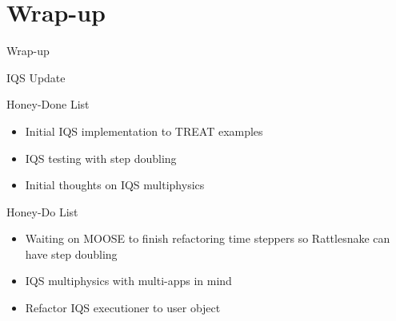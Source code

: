 \documentclass[8pt,xcolor=dvipnames]{beamer}
\newcommand{\bi}{\begin{itemize}}
\newcommand{\ei}{\end{itemize}}
\begin{document}
\section{Wrap-up}

\begin{frame}{Wrap-up}

\tableofcontents[currentsection]

\end{frame}


\begin{frame}{IQS Update}

\begin{block}{Honey-Done List}
\bi
\item Initial IQS implementation to TREAT examples
\item IQS testing with step doubling
\item Initial thoughts on IQS multiphysics 
\ei
\end{block}

\begin{block}{Honey-Do List}
\bi 
\item Waiting on MOOSE to finish refactoring time steppers so Rattlesnake can have step doubling
\item IQS multiphysics with multi-apps in mind
\item Refactor IQS executioner to user object
\ei
\end{block}

\end{frame}
\end{document}
